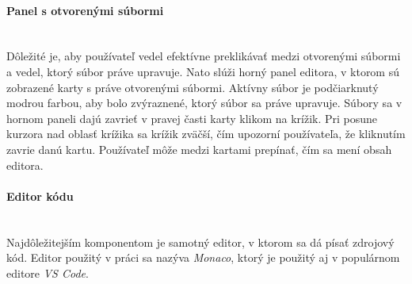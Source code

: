 \paragraph{Panel s otvorenými súbormi}\leavevmode\\
Dôležité je, aby používateľ vedel efektívne preklikávať medzi otvorenými súbormi a vedel, ktorý
súbor práve upravuje. Nato slúži horný panel editora, v ktorom sú zobrazené karty s práve otvorenými
súbormi. Aktívny súbor je podčiarknutý modrou farbou, aby bolo zvýraznené, ktorý súbor sa práve
upravuje. Súbory sa v hornom paneli dajú zavrieť v pravej časti karty klikom na krížik. Pri posune
kurzora nad oblasť krížika sa krížik zväčší, čím upozorní používateľa, že kliknutím zavrie danú
kartu. Používateľ môže medzi kartami prepínať, čím sa mení obsah editora.

\paragraph{Editor kódu}\leavevmode\\
Najdôležitejším komponentom je samotný editor, v ktorom sa dá písať zdrojový kód. Editor použitý v
práci sa nazýva \textit{Monaco}, ktorý je použitý aj v populárnom editore \textit{VS Code}. 

